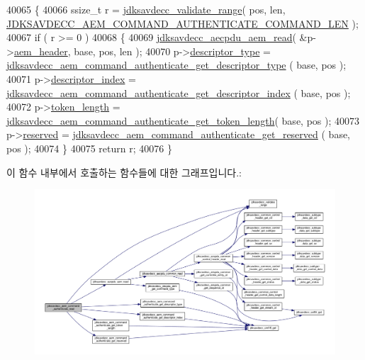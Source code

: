 \begin{DoxyCode}
40065 \{
40066     ssize\_t r = \hyperlink{group__util_ga9c02bdfe76c69163647c3196db7a73a1}{jdksavdecc\_validate\_range}( pos, len, 
      \hyperlink{group__command__authenticate_ga4fc8006ff44cdde3e0c193973f0e4831}{JDKSAVDECC\_AEM\_COMMAND\_AUTHENTICATE\_COMMAND\_LEN} );
40067     \textcolor{keywordflow}{if} ( r >= 0 )
40068     \{
40069         \hyperlink{group__aecpdu__aem_gae2421015dcdce745b4f03832e12b4fb6}{jdksavdecc\_aecpdu\_aem\_read}( &p->\hyperlink{structjdksavdecc__aem__command__authenticate_ae1e77ccb75ff5021ad923221eab38294}{aem\_header}, base, pos, len );
40070         p->\hyperlink{structjdksavdecc__aem__command__authenticate_ab7c32b6c7131c13d4ea3b7ee2f09b78d}{descriptor\_type} = 
      \hyperlink{group__command__authenticate_gab4d7a396b0a39e094bb57a21c5697cf0}{jdksavdecc\_aem\_command\_authenticate\_get\_descriptor\_type}
      ( base, pos );
40071         p->\hyperlink{structjdksavdecc__aem__command__authenticate_a042bbc76d835b82d27c1932431ee38d4}{descriptor\_index} = 
      \hyperlink{group__command__authenticate_gaa20d61859334e4bf12677ccc80220622}{jdksavdecc\_aem\_command\_authenticate\_get\_descriptor\_index}
      ( base, pos );
40072         p->\hyperlink{structjdksavdecc__aem__command__authenticate_a97da4c134a2723b8dbcd1c88d8577991}{token\_length} = 
      \hyperlink{group__command__authenticate_gac1a07f001172b01d8199d7a9483aea77}{jdksavdecc\_aem\_command\_authenticate\_get\_token\_length}( 
      base, pos );
40073         p->\hyperlink{structjdksavdecc__aem__command__authenticate_a5a6ed8c04a3db86066924b1a1bf4dad3}{reserved} = \hyperlink{group__command__authenticate_ga9867a66fbdcbf3e2dbd6bb195bd7c5ae}{jdksavdecc\_aem\_command\_authenticate\_get\_reserved}
      ( base, pos );
40074     \}
40075     \textcolor{keywordflow}{return} r;
40076 \}
\end{DoxyCode}


이 함수 내부에서 호출하는 함수들에 대한 그래프입니다.\+:
\nopagebreak
\begin{figure}[H]
\begin{center}
\leavevmode
\includegraphics[width=350pt]{group__command__authenticate_ga7c852288dc51972be0e549e27b6f0e54_cgraph}
\end{center}
\end{figure}


